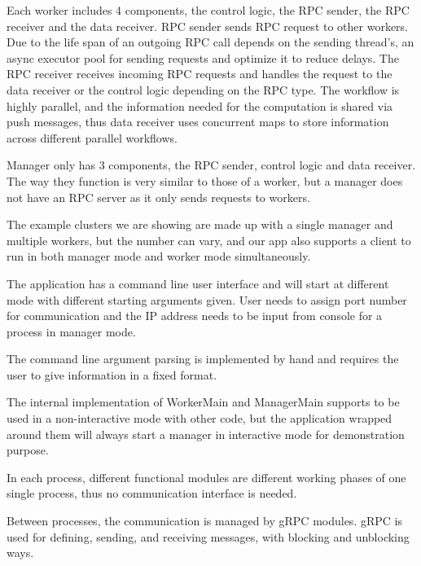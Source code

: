 Each worker includes 4 components, the control logic, the RPC sender, the RPC receiver and the data receiver. RPC sender sends RPC request to other workers. Due to the life span of an outgoing RPC call depends on the sending thread’s, an async executor pool for sending requests and optimize it to reduce delays. The RPC receiver receives incoming RPC requests and handles the request to the data receiver or the control logic depending on the RPC type. The workflow is highly parallel, and the information needed for the computation is shared via push messages, thus data receiver uses concurrent maps to store information across different parallel workflows.

Manager only has 3 components, the RPC sender, control logic and data receiver. The way they function is very similar to those of a worker, but a manager does not have an RPC server as it only sends requests to workers.

The example clusters we are showing are made up with a single manager and multiple workers, but the number can vary, and our app also supports a client to run in both manager mode and worker mode simultaneously.

The application has a command line user interface and will start at different mode with different starting arguments given. User needs to assign port number for communication and the IP address needs to be input from console for a process in manager mode.

The command line argument parsing is implemented by hand and requires the user to give information in a fixed format.

The internal implementation of WorkerMain and ManagerMain supports to be used in a non-interactive mode with other code, but the application wrapped around them will always start a manager in interactive mode for demonstration purpose.

In each process, different functional modules are different working phases of one single process, thus no communication interface is needed.

Between processes, the communication is managed by gRPC modules. gRPC is used for defining, sending, and receiving messages, with blocking and unblocking ways.

